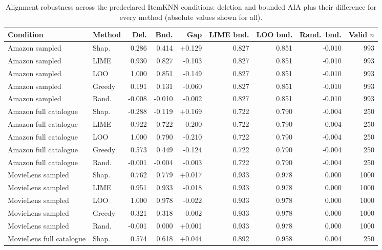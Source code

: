 \begin{table}[!htbp]\centering\scriptsize\setlength{\tabcolsep}{2.5pt}
\caption{Alignment robustness across the predeclared ItemKNN conditions: deletion and
bounded AIA plus their difference for every method (absolute values shown for all).}
\label{tab:app-alignment}
\begin{tabular}{@{}llrrrrrrr@{}}
\toprule
Condition & Method & Del. & Bnd. & Gap & LIME bnd. & LOO bnd. & Rand.\ bnd. & Valid $n$ \\
\midrule
Amazon sampled & Shap. & 0.286 & 0.414 & +0.129 & 0.827 & 0.851 & -0.010 & 993 \\
Amazon sampled & LIME & 0.930 & 0.827 & -0.103 & 0.827 & 0.851 & -0.010 & 993 \\
Amazon sampled & LOO & 1.000 & 0.851 & -0.149 & 0.827 & 0.851 & -0.010 & 993 \\
Amazon sampled & Greedy & 0.191 & 0.131 & -0.060 & 0.827 & 0.851 & -0.010 & 993 \\
Amazon sampled & Rand. & -0.008 & -0.010 & -0.002 & 0.827 & 0.851 & -0.010 & 993 \\
Amazon full catalogue & Shap. & -0.288 & -0.119 & +0.169 & 0.722 & 0.790 & -0.004 & 250 \\
Amazon full catalogue & LIME & 0.922 & 0.722 & -0.200 & 0.722 & 0.790 & -0.004 & 250 \\
Amazon full catalogue & LOO & 1.000 & 0.790 & -0.210 & 0.722 & 0.790 & -0.004 & 250 \\
Amazon full catalogue & Greedy & 0.573 & 0.449 & -0.124 & 0.722 & 0.790 & -0.004 & 250 \\
Amazon full catalogue & Rand. & -0.001 & -0.004 & -0.003 & 0.722 & 0.790 & -0.004 & 250 \\
MovieLens sampled & Shap. & 0.762 & 0.779 & +0.017 & 0.933 & 0.978 & 0.000 & 1000 \\
MovieLens sampled & LIME & 0.951 & 0.933 & -0.018 & 0.933 & 0.978 & 0.000 & 1000 \\
MovieLens sampled & LOO & 1.000 & 0.978 & -0.022 & 0.933 & 0.978 & 0.000 & 1000 \\
MovieLens sampled & Greedy & 0.321 & 0.318 & -0.002 & 0.933 & 0.978 & 0.000 & 1000 \\
MovieLens sampled & Rand. & -0.001 & 0.000 & +0.001 & 0.933 & 0.978 & 0.000 & 1000 \\
MovieLens full catalogue & Shap. & 0.574 & 0.618 & +0.044 & 0.892 & 0.958 & 0.004 & 250 \\

\end{tabular}
\end{table}
